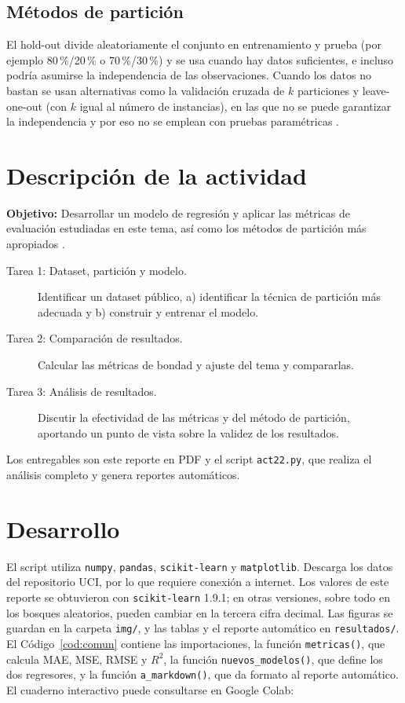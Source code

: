 \documentclass[11pt,letterpaper]{article}
\begin{document}
\subsection{Métodos de partición}

El hold-out divide aleatoriamente el conjunto en entrenamiento y prueba (por ejemplo 80\,\%/20\,\% o 70\,\%/30\,\%) y se usa cuando hay datos suficientes, e incluso podría asumirse la independencia de las observaciones. Cuando los datos no bastan se usan alternativas como la validación cruzada de $k$ particiones y leave-one-out (con $k$ igual al número de instancias), en las que no se puede garantizar la independencia y por eso no se emplean con pruebas paramétricas \parencite{tecnm2026_tema33}.

\section{Descripción de la actividad}

\textbf{Objetivo:} Desarrollar un modelo de regresión y aplicar las métricas de evaluación estudiadas en este tema, así como los métodos de partición más apropiados \parencite{tecnm2026_tema33}.

\begin{description}
    \item[Tarea 1: Dataset, partición y modelo.] Identificar un dataset público, a) identificar la técnica de partición más adecuada y b) construir y entrenar el modelo.
    \item[Tarea 2: Comparación de resultados.] Calcular las métricas de bondad y ajuste del tema y compararlas.
    \item[Tarea 3: Análisis de resultados.] Discutir la efectividad de las métricas y del método de partición, aportando un punto de vista sobre la validez de los resultados.
\end{description}

Los entregables son este reporte en PDF y el script \texttt{act22.py}, que realiza el análisis completo y genera reportes automáticos.

\section{Desarrollo}

El script utiliza \texttt{numpy}, \texttt{pandas}, \texttt{scikit-learn} y \texttt{matplotlib}. Descarga los datos del repositorio UCI, por lo que requiere conexión a internet. Los valores de este reporte se obtuvieron con \texttt{scikit-learn} 1.9.1; en otras versiones, sobre todo en los bosques aleatorios, pueden cambiar en la tercera cifra decimal. Las figuras se guardan en la carpeta \texttt{img/}, y las tablas y el reporte automático en \texttt{resultados/}. El Código~\ref{cod:comun} contiene las importaciones, la función \texttt{metricas()}, que calcula MAE, MSE, RMSE y $R^2$, la función \texttt{nuevos\_modelos()}, que define los dos regresores, y la función \texttt{a\_markdown()}, que da formato al reporte automático. El cuaderno interactivo puede consultarse en Google Colab:
\end{document}
